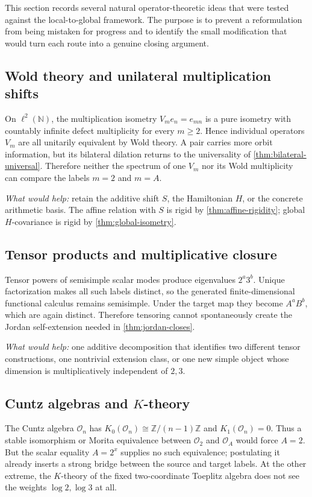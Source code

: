 \documentclass[11pt,oneside]{article}
\theoremstyle{definition}
\theoremstyle{remark}
\newcommand{\N}{\mathbb N}
\newcommand{\Z}{\mathbb Z}
\begin{document}
This section records several natural operator-theoretic ideas that were
tested against the local-to-global framework.  The purpose is to prevent
a reformulation from being mistaken for progress and to identify the
small modification that would turn each route into a genuine closing
argument.

\subsection{Wold theory and unilateral multiplication shifts}

On \(\ell^2(\N)\), the multiplication isometry
\(V_m e_n=e_{mn}\) is a pure isometry with countably infinite defect
multiplicity for every \(m\geq2\).  Hence individual operators \(V_m\)
are all unitarily equivalent by Wold theory.  A pair carries more orbit
information, but its bilateral dilation returns to the universality of
\cref{thm:bilateral-universal}.  Therefore neither the spectrum of one
\(V_m\) nor its Wold multiplicity can compare the labels \(m=2\) and
\(m=A\).

\emph{What would help:} retain the additive shift \(S\), the Hamiltonian
\(H\), or the concrete arithmetic basis.  The affine relation with \(S\)
is rigid by \cref{thm:affine-rigidity}; global \(H\)-covariance is rigid
by \cref{thm:global-isometry}.

\subsection{Tensor products and multiplicative closure}

Tensor powers of semisimple scalar modes produce eigenvalues
\(2^a3^b\).  Unique factorization makes all such labels distinct, so
the generated finite-dimensional functional calculus remains
semisimple.  Under the target map they become \(A^aB^b\), which are
again distinct.  Therefore tensoring cannot spontaneously create the
Jordan self-extension needed in \cref{thm:jordan-closes}.

\emph{What would help:} one additive decomposition that identifies two
different tensor constructions, one nontrivial extension class, or one
new simple object whose dimension is multiplicatively independent of
\(2,3\).

\subsection{Cuntz algebras and \(K\)-theory}

The Cuntz algebra \(\mathcal O_n\) has \cite{Cuntz1977}
\(K_0(\mathcal O_n)\cong\Z/(n-1)\Z\) and \(K_1(\mathcal O_n)=0\).
Thus a stable isomorphism or Morita equivalence between
\(\mathcal O_2\) and \(\mathcal O_A\) would force \(A=2\).  But the
scalar equality \(A=2^x\) supplies no such equivalence; postulating it
already inserts a strong bridge between the source and target labels.
At the other extreme, the \(K\)-theory of the fixed two-coordinate
Toeplitz algebra does not see the weights \(\log2,\log3\) at all.
\end{document}
